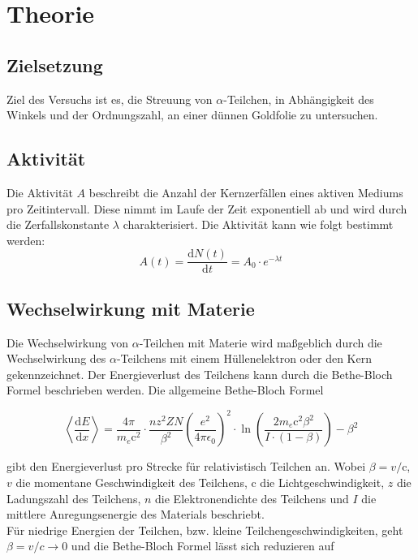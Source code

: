 \section{Theorie}
\label{sec:Theorie}
\subsection{Zielsetzung}
Ziel des Versuchs ist es, die Streuung von $\alpha$-Teilchen, in Abhängigkeit des Winkels und der Ordnungszahl, an einer dünnen Goldfolie zu untersuchen. 

\subsection{Aktivität}

Die Aktivität $A$ beschreibt die Anzahl der Kernzerfällen eines aktiven Mediums
pro Zeitintervall. Diese nimmt im Laufe der Zeit exponentiell ab und wird durch
die Zerfallskonstante $\lambda$ charakterisiert. Die Aktivität kann wie folgt bestimmt werden:
$$ A(t)=\frac{\text{d}N(t)}{\text{d}t}=A_0\cdot e^{-\lambda t}$$

\subsection{Wechselwirkung mit Materie}

Die Wechselwirkung von $\alpha$-Teilchen mit Materie wird
maßgeblich durch die Wechselwirkung des $\alpha$-Teilchens mit einem
Hüllenelektron oder den Kern gekennzeichnet. Der Energieverlust des Teilchens
kann durch die Bethe-Bloch Formel beschrieben werden.
Die allgemeine Bethe-Bloch Formel

\begin{equation}
    \label{betherel}
    \left<\frac{\text{d}E}{\text{d}x}\right>=\frac{4\pi}{m_e \text{c}^2}\cdot \frac{n z^2ZN}{\beta^2}
    \left(\frac{e^2}{4\pi \epsilon_0}\right)^2\cdot\ln\left(\frac{2 m_e \text{c}^2\beta^2}{I\cdot(1-\beta)}\right)-\beta^2
\end{equation}

gibt den Energieverlust pro Strecke für relativistisch Teilchen an. Wobei $\beta=v/$c, $v$
die momentane Geschwindigkeit des Teilchens, c die Lichtgeschwindigkeit,
$z$ die Ladungszahl des Teilchens, $n$ die Elektronendichte des Teilchens und $I$ die
mittlere Anregungsenergie des Materials beschriebt.\\
Für niedrige Energien der Teilchen, bzw. kleine Teilchengeschwindigkeiten, geht
$\beta=v/c \rightarrow 0$ und die Bethe-Bloch Formel lässt sich reduzieren auf

